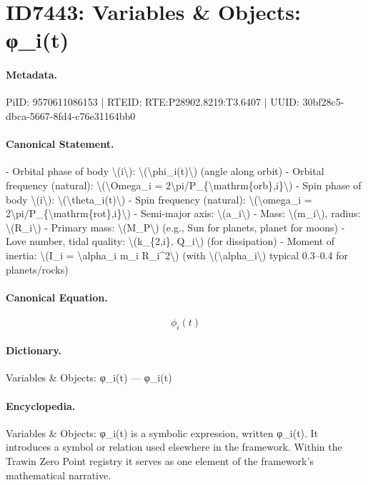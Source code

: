 \section*{ID7443: Variables \& Objects: φ\_i(t)}
\paragraph{Metadata.}
PiID: 9570611086153 | RTEID: RTE:P28902.8219:T3.6407 | UUID: 30bf28c5-dbca-5667-8fd4-c76e31164bb0

\paragraph{Canonical Statement.}
- Orbital phase of body \textbackslash{}(i\textbackslash{}): \textbackslash{}(\textbackslash{}phi\_i(t)\textbackslash{}) (angle along orbit) - Orbital frequency (natural): \textbackslash{}(\textbackslash{}Omega\_i = 2\textbackslash{}pi/P\_\{\textbackslash{}mathrm\{orb\},i\}\textbackslash{}) - Spin phase of body \textbackslash{}(i\textbackslash{}): \textbackslash{}(\textbackslash{}theta\_i(t)\textbackslash{}) - Spin frequency (natural): \textbackslash{}(\textbackslash{}omega\_i = 2\textbackslash{}pi/P\_\{\textbackslash{}mathrm\{rot\},i\}\textbackslash{}) - Semi-major axis: \textbackslash{}(a\_i\textbackslash{}) - Mass: \textbackslash{}(m\_i\textbackslash{}), radius: \textbackslash{}(R\_i\textbackslash{}) - Primary mass: \textbackslash{}(M\_P\textbackslash{}) (e.g., Sun for planets, planet for moons) - Love number, tidal quality: \textbackslash{}(k\_\{2,i\}, Q\_i\textbackslash{}) (for dissipation) - Moment of inertia: \textbackslash{}(I\_i = \textbackslash{}alpha\_i m\_i R\_i\textasciicircum{}2\textbackslash{}) (with \textbackslash{}(\textbackslash{}alpha\_i\textbackslash{}) typical 0.3–0.4 for planets/rocks)

\paragraph{Canonical Equation.}
\[
\phi_i(t)
\]

\paragraph{Dictionary.}
Variables \& Objects: φ\_i(t) — φ\_i(t)

\paragraph{Encyclopedia.}
Variables \& Objects: φ\_i(t) is a symbolic expression, written φ\_i(t). It introduces a symbol or relation used elsewhere in the framework. Within the Trawin Zero Point registry it serves as one element of the framework's mathematical narrative.

